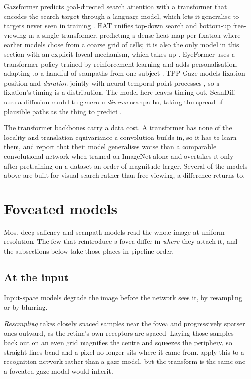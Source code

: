 Gazeformer predicts
goal-directed search attention with a transformer that encodes the search target
through a language model, which lets it generalise to targets never seen in training
\citep{mondal2023gazeformer}. HAT unifies top-down search and bottom-up free-viewing
in a single transformer, predicting a dense heat-map per fixation where earlier models chose
from a coarse grid of cells; it is also the only model in this section with an explicit foveal
mechanism, which  takes up \citep{yang2024hat}. EyeFormer uses a transformer policy trained by
reinforcement learning and adds personalisation, adapting to a handful of scanpaths from one subject
\citep{jiang2024eyeformer}. TPP-Gaze models fixation position and \emph{duration} jointly with neural
temporal point processes \citep{damelio2025tppgaze}, so a fixation's timing is a distribution. The
model here leaves timing out. ScanDiff uses a
diffusion model to generate \emph{diverse} scanpaths, taking the spread of plausible
paths as the thing to predict \citep{cartella2025scandiff}.

The transformer backbones carry a data cost. A transformer has none of the locality and translation
equivariance a convolution builds in, so it has to learn them, and \citet{dosovitskiy2021vit} report that
their model generalises worse than a comparable convolutional network when trained on ImageNet alone
and overtakes it only after pretraining on a dataset an order of magnitude larger. Several of the models
above are built for visual search rather than free viewing, a difference  returns to.

\section{Foveated models}
\label{sec:foveated-models}

Most deep saliency and scanpath models read the whole image at uniform resolution. The few that
reintroduce a fovea differ in \emph{where} they attach it, and the subsections below take those places
in pipeline order.

\subsection{At the input}
\label{subsec:fov-input}

Input-space models degrade the image before the network sees it, by resampling or by blurring.

\emph{Resampling} takes closely
spaced samples near the fovea and progressively sparser ones outward, as the retina's own receptors are
spaced. Laying those samples back out on an even grid magnifies the centre and squeezes the periphery, so
straight lines bend and a pixel no longer sits where it came from. \citet{dacosta2024retinal} apply this
to a recognition network rather than a gaze model, but the transform is the same one a foveated gaze
model would inherit.

